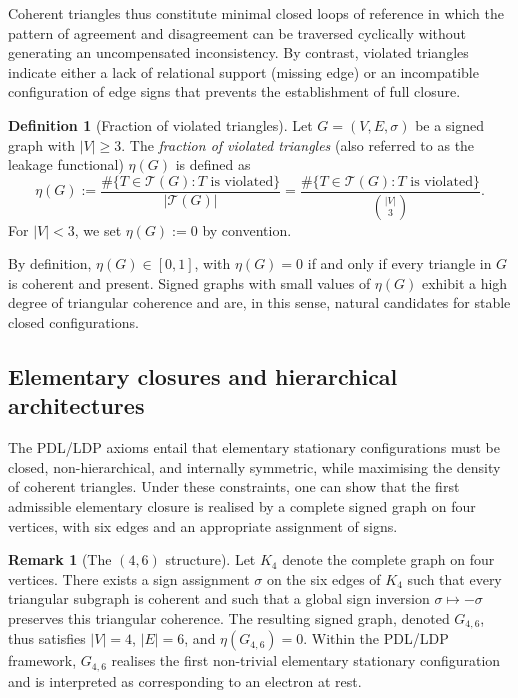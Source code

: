\documentclass[11pt,a4paper]{article}
\theoremstyle{definition}
\newtheorem{definition}[theorem]{Definition}
\newtheorem{remark}[theorem]{Remark}
\newcommand{\Ttri}{\mathcal{T}} %
\begin{document}
Coherent triangles thus constitute minimal closed loops of reference in which the pattern of agreement and disagreement can be traversed cyclically without generating an uncompensated inconsistency. By contrast, violated triangles indicate either a lack of relational support (missing edge) or an incompatible configuration of edge signs that prevents the establishment of full closure.

\begin{definition}[Fraction of violated triangles]
Let \(G = (V,E,\sigma)\) be a signed graph with \(|V| \geq 3\). The \emph{fraction of violated triangles} (also referred to as the leakage functional) \(\eta(G)\) is defined as
\[
 \eta(G) := \frac{\#\{ T \in \Ttri(G) : T \text{ is violated} \}}{|\Ttri(G)|} = \frac{\#\{ T \in \Ttri(G) : T \text{ is violated} \}}{\binom{|V|}{3}}.
\]
For \(|V| < 3\), we set \(\eta(G) := 0\) by convention.
\end{definition}

By definition, \(\eta(G) \in [0,1]\), with \(\eta(G) = 0\) if and only if every triangle in \(G\) is coherent and present. Signed graphs with small values of \(\eta(G)\) exhibit a high degree of triangular coherence and are, in this sense, natural candidates for stable closed configurations.

\subsection{Elementary closures and hierarchical architectures}

The PDL/LDP axioms entail that elementary stationary configurations must be closed, non-hierarchical, and internally symmetric, while maximising the density of coherent triangles. Under these constraints, one can show that the first admissible elementary closure is realised by a complete signed graph on four vertices, with six edges and an appropriate assignment of signs.

\begin{remark}[The \texorpdfstring{$(4,6)$}{(4,6)} structure]
Let \(K_4\) denote the complete graph on four vertices. There exists a sign assignment \(\sigma\) on the six edges of \(K_4\) such that every triangular subgraph is coherent and such that a global sign inversion \(\sigma \mapsto -\sigma\) preserves this triangular coherence. The resulting signed graph, denoted \(G_{4,6}\), thus satisfies \(|V| = 4\), \(|E| = 6\), and \(\eta(G_{4,6}) = 0\). Within the PDL/LDP framework, \(G_{4,6}\) realises the first non-trivial elementary stationary configuration and is interpreted as corresponding to an electron at rest.
\end{remark}
\end{document}
